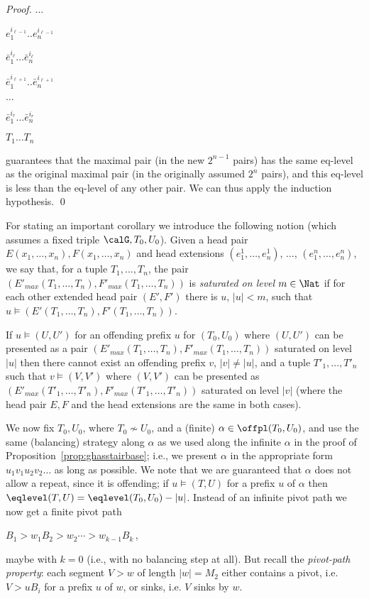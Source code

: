 \documentclass[12pt]{article}
\begin{document}
\begin{proof}
{{$\dots$

${e}^{i_{\ell-1}}_1 .. {e}^{i_{\ell-1}}_n$

$\bar{e}^{i_{\ell}}_1 \dots \bar{e}^{i_{\ell}}_n$

$\bar{e}^{i_{\ell+1}}_1 .. \bar{e}^{i_{\ell+1}}_n$

$\dots$


$\bar{e}^{i_r}_1 \dots \bar{e}^{i_r}_{n}$

$T_1 \dots T_{n}$
}
}

\noindent
guarantees that 
the maximal pair (in the new $2^{n-1}$ pairs) 
has the same eq-level as the 
original maximal
pair (in the originally assumed $2^n$ pairs),
and this eq-level is less than the eq-level of any other pair.
We can thus apply the induction hypothesis.
\qed
\end{proof}


\noindent
For stating an important corollary we introduce the following notion
(which assumes a fixed triple $\calG, T_0,U_0$).
Given a head pair $E(x_1,\dots,x_n),F(x_1,\dots,x_n)$
and head extensions
$(e^1_1,\dots,e^1_n)$, $\dots$, $(e^n_1,\dots,e^n_n)$,
we say that, for a tuple $T_1,\dots,T_n$,
the pair
$(E'_{max}(T_1,\dots,T_n),F'_{max}(T_1,\dots,T_n))$
is \emph{saturated on level} $m\in\Nat$ 
if for each other extended head pair $(E',F')$ there is $u$, 
$|u|<m$, such that 
$u\models (E'(T_1,\dots,T_n),F'(T_1,\dots,T_n))$.

\begin{cor}\label{cor:repeateqlevel}
If $u\models (U,U')$ for an offending prefix $u$ for $(T_0,U_0)$
where $(U,U')$ can be presented
as a pair $(E'_{max}(T_1,\dots,T_n),F'_{max}(T_1,\dots,T_n))$
saturated on level $|u|$
then 
there cannot exist
an offending prefix $v$, $|v|\neq |u|$,
and a tuple $T'_1,\dots,T'_n$
such that $v\models (V,V')$ where 
$(V,V')$ can be presented
as $(E'_{max}(T'_1,\dots,T'_n),F'_{max}(T'_1,\dots,T'_n))$
saturated on level $|v|$ (where the head pair $E,F$ and the head
extensions are the same in both cases).
\end{cor}

\noindent
We now fix $T_0,U_0$, where $T_0\not\sim U_0$,
and a (finite) $\alpha\in\offpl(T_0,U_0)$, and use  
the same (balancing) strategy 
along $\alpha$
as we used along the infinite
$\alpha$ in the proof of Proposition~\ref{prop:ghasstairbase}; i.e.,
we present $\alpha$ in the appropriate form $u_1v_1u_2v_2\dots$ as long as
possible. We note that we are guaranteed that $\alpha$ does not allow
a repeat, since it is offending;
if $u\models (T,U)$ for a prefix $u$ of $\alpha$
then $\eqlevel(T,U)=\eqlevel(T_0,U_0)-|u|$. 
Instead of an infinite pivot path 
we now get
a finite pivot path 
\begin{center}
$B_1\gt{w_1} B_2\gt{w_2}\cdots\gt{w_{k-1}}B_k$\,,
\end{center}
maybe with $k=0$ (i.e., with no balancing step at all).
But recall the \emph{pivot-path property}: each segment $V\gt{w}$
of length $|w|=M_2$ either contains a pivot, i.e.
$V\gt{u}B_i$ for a prefix $u$ of $w$, or sinks, i.e. $V$ sinks by $w$.
\end{document}
